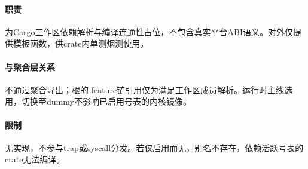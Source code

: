 
\paragraph{职责}

为Cargo工作区依赖解析与编译连通性占位，不包含真实平台ABI语义。对外仅提供模板函数，供crate内单测烟测使用。

\paragraph{与聚合层关系}

不通过聚合导出；根的 feature链引用仅为满足工作区成员解析。运行时主线选用，切换至dummy不影响已启用号表的内核镜像。

\paragraph{限制}

无实现，不参与trap或syscall分发。若仅启用而无，别名不存在，依赖活跃号表的crate无法编译。
